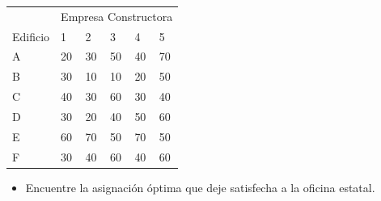 \documentclass[letterpaper]{article}
\begin{document}
\begin{table}[H]
\begin{center}
\begin{tabular}{llllll}
\hline
         & \multicolumn{5}{c}{Empresa Constructora} \\
Edificio & 1      & 2      & 3      & 4     & 5     \\ \hline
A        & 20     & 30     & 50     & 40    & 70    \\
B        & 30     & 10     & 10     & 20    & 50    \\
C        & 40     & 30     & 60     & 30    & 40    \\
D        & 30     & 20     & 40     & 50    & 60    \\
E        & 60     & 70     & 50     & 70    & 50    \\
F        & 30     & 40     & 60     & 40    & 60    \\
\hline
\end{tabular}
\end{center}
\end{table}

\begin{itemize}
\item Encuentre la asignación óptima que deje satisfecha a la oficina estatal.
\end{itemize}
\end{document}
